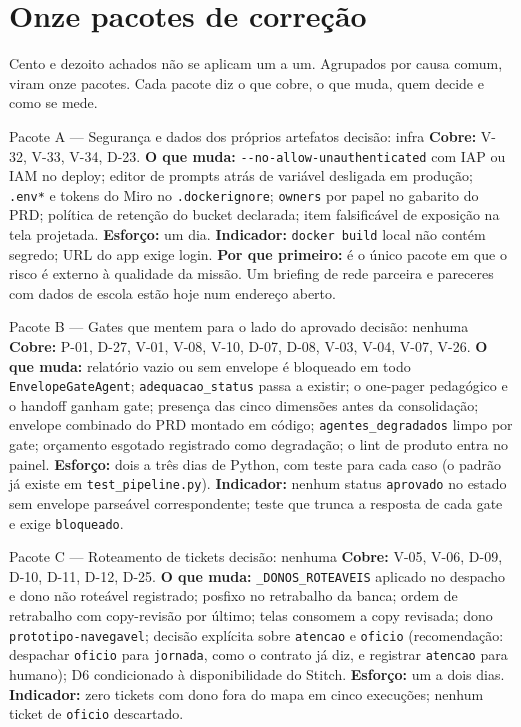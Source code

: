 \documentclass[11pt,a4paper]{article}
\begin{document}
\section{Onze pacotes de correção}
\label{sec:pacotes}

Cento e dezoito achados não se aplicam um a um. Agrupados por causa comum, viram onze pacotes.
Cada pacote diz o que cobre, o que muda, quem decide e como se mede.

\begin{achadobox}{Pacote A --- Segurança e dados dos próprios artefatos \hfill decisão: infra}
\textbf{Cobre:} V-32, V-33, V-34, D-23.
\textbf{O que muda:} \texttt{-{}-no-allow-unauthenticated} com IAP ou IAM no deploy; editor de prompts
atrás de variável desligada em produção; \texttt{.env*} e tokens do Miro no \texttt{.dockerignore};
\texttt{owners} por papel no gabarito do PRD; política de retenção do bucket declarada; item
falsificável de exposição na tela projetada.
\textbf{Esforço:} um dia. \textbf{Indicador:} \texttt{docker build} local não contém segredo; URL do
app exige login.
\textbf{Por que primeiro:} é o único pacote em que o risco é externo à qualidade da missão. Um
briefing de rede parceira e pareceres com dados de escola estão hoje num endereço aberto.
\end{achadobox}

\begin{achadobox}{Pacote B --- Gates que mentem para o lado do aprovado \hfill decisão: nenhuma}
\textbf{Cobre:} P-01, D-27, V-01, V-08, V-10, D-07, D-08, V-03, V-04, V-07, V-26.
\textbf{O que muda:} relatório vazio ou sem envelope é bloqueado em todo \texttt{EnvelopeGateAgent};
\texttt{adequacao\_status} passa a existir; o one-pager pedagógico e o handoff ganham gate; presença das
cinco dimensões antes da consolidação; envelope combinado do PRD montado em código;
\texttt{agentes\_degradados} limpo por gate; orçamento esgotado registrado como degradação; o lint de
produto entra no painel.
\textbf{Esforço:} dois a três dias de Python, com teste para cada caso (o padrão já existe em
\texttt{test\_pipeline.py}).
\textbf{Indicador:} nenhum status \texttt{aprovado} no estado sem envelope parseável correspondente;
teste que trunca a resposta de cada gate e exige \texttt{bloqueado}.
\end{achadobox}

\begin{achadobox}{Pacote C --- Roteamento de tickets \hfill decisão: nenhuma}
\textbf{Cobre:} V-05, V-06, D-09, D-10, D-11, D-12, D-25.
\textbf{O que muda:} \texttt{\_DONOS\_ROTEAVEIS} aplicado no despacho e dono não roteável registrado;
posfixo no retrabalho da banca; ordem de retrabalho com copy-revisão por último; telas consomem a copy
revisada; dono \texttt{prototipo-navegavel}; decisão explícita sobre \texttt{atencao} e \texttt{oficio}
(recomendação: despachar \texttt{oficio} para \texttt{jornada}, como o contrato já diz, e registrar
\texttt{atencao} para humano); D6 condicionado à disponibilidade do Stitch.
\textbf{Esforço:} um a dois dias.
\textbf{Indicador:} zero tickets com dono fora do mapa em cinco execuções; nenhum ticket de
\texttt{oficio} descartado.
\end{achadobox}
\end{document}
